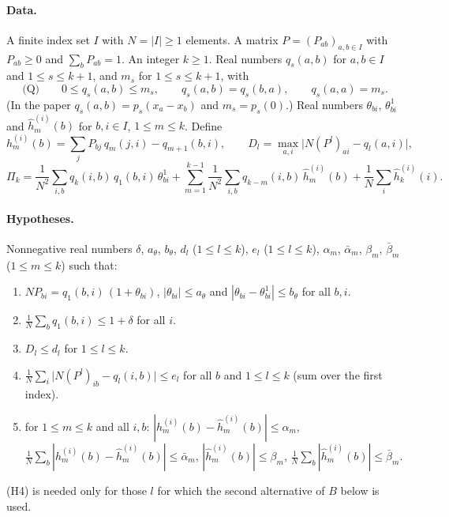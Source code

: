 
\paragraph{Data.} A finite index set $I$ with $N=|I|\ge1$ elements. A matrix $P=(P_{ab})_{a,b\in I}$ with
$P_{ab}\ge0$ and $\sum_bP_{ab}=1$. An integer $k\ge1$. Real numbers $q_s(a,b)$ for $a,b\in I$ and
$1\le s\le k+1$, and $m_s$ for $1\le s\le k+1$, with
\[
 \text{(Q)}\qquad 0\le q_s(a,b)\le m_s,\qquad q_s(a,b)=q_s(b,a),\qquad q_s(a,a)=m_s .
\]
(In the paper $q_s(a,b)=p_s(x_a-x_b)$ and $m_s=p_s(0)$.) Real numbers $\theta_{bi}$, $\theta^1_{bi}$ and
$\hat h^{(i)}_m(b)$ for $b,i\in I$, $1\le m\le k$. Define
\[
 h^{(i)}_m(b)=\sum_jP_{bj}\,q_m(j,i)-q_{m+1}(b,i),\qquad
 D_l=\max_{a,i}\big|N(P^l)_{ai}-q_l(a,i)\big| ,
\]
\[
 \Pi_k=\frac1{N^2}\sum_{i,b}q_k(i,b)\,q_1(b,i)\,\theta^1_{bi}
 +\sum_{m=1}^{k-1}\frac1{N^2}\sum_{i,b}q_{k-m}(i,b)\,\hat h^{(i)}_m(b)+\frac1N\sum_i\hat h^{(i)}_k(i).
\]

\paragraph{Hypotheses.} Nonnegative real numbers $\delta$, $a_\theta$, $b_\theta$, $d_l$ ($1\le l\le k$),
$e_l$ ($1\le l\le k$), $\alpha_m$, $\bar\alpha_m$, $\beta_m$, $\bar\beta_m$ ($1\le m\le k$) such that:
\begin{enumerate}
\item[(H1)] $NP_{bi}=q_1(b,i)\,(1+\theta_{bi})$, $|\theta_{bi}|\le a_\theta$ and $|\theta_{bi}-\theta^1_{bi}|\le b_\theta$ for all $b,i$.
\item[(H2)] $\frac1N\sum_bq_1(b,i)\le1+\delta$ for all $i$.
\item[(H3)] $D_l\le d_l$ for $1\le l\le k$.
\item[(H4)] $\frac1N\sum_i\big|N(P^l)_{ib}-q_l(i,b)\big|\le e_l$ for all $b$ and $1\le l\le k$ (sum over the first index).
\item[(H5)] for $1\le m\le k$ and all $i,b$: $|h^{(i)}_m(b)-\hat h^{(i)}_m(b)|\le\alpha_m$,
 $\frac1N\sum_b|h^{(i)}_m(b)-\hat h^{(i)}_m(b)|\le\bar\alpha_m$, $|\hat h^{(i)}_m(b)|\le\beta_m$,
 $\frac1N\sum_b|\hat h^{(i)}_m(b)|\le\bar\beta_m$.
\end{enumerate}
(H4) is needed only for those $l$ for which the second alternative of $B$ below is used.

